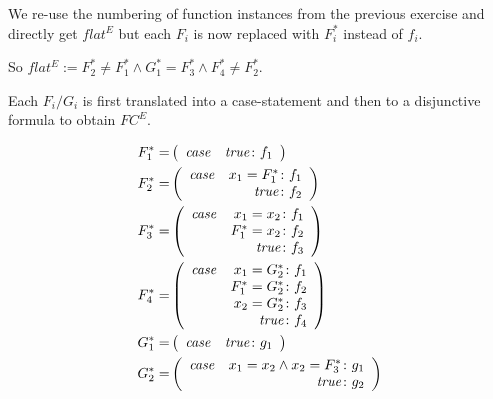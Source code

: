 \documentclass[11pt,a4paper]{uebung}
\begin{document}
\begin{enumerate}[a)]
{  We re-use the numbering of function instances from the previous exercise and
  directly get $flat^E$ but each $F_i$ is now replaced with $F_i^*$ instead of
  $f_i$.

  So $flat^E:= F_2^* \neq F_1^* \land G_1^* = F_3^* \land F_4^* \neq F_2^*$.

  Each $F_i/G_i$ is first translated into a case-statement and then to a
  disjunctive formula to obtain $FC^E$.

\def\true{\mathit{true}}

  \begin{align*}
    F_1^* =&
    \left(\begin{array}{lr@{ \colon }l}
      \mathit{case} & \true & f_1
    \end{array}\right)\\
    F_2^* =&
    \left(\begin{array}{lr@{ \colon }l}
      \mathit{case} & x_1=F^*_1 & f_1 \\
      & \true & f_2
    \end{array}\right)\\
    F_3^* =&
    \left(\begin{array}{lr@{ \colon }l}
      \mathit{case} & x_1=x_2 & f_1 \\
      & F^*_1=x_2 & f_2 \\
      & \true & f_3
    \end{array}\right)\\
    F_4^* =&
    \left(\begin{array}{lr@{ \colon }l}
      \mathit{case} & x_1=G^*_2 & f_1 \\
      & F^*_1=G^*_2 & f_2 \\
      & x_2 =G^*_2 & f_3 \\
      & \true & f_4
    \end{array}\right)\\
    G_1^* =&
    \left(\begin{array}{lr@{ \colon }l}
      \mathit{case} & \true & g_1 \\
    \end{array}\right)\\
    G_2^* =&
    \left(\begin{array}{lr@{ \colon }l}
      \mathit{case} & x_1=x_2 \land x_2=F^*_3 & g_1 \\
      & \true &  g_2
    \end{array}\right)\\
  \end{align*}

}
\end{enumerate}
\end{document}
